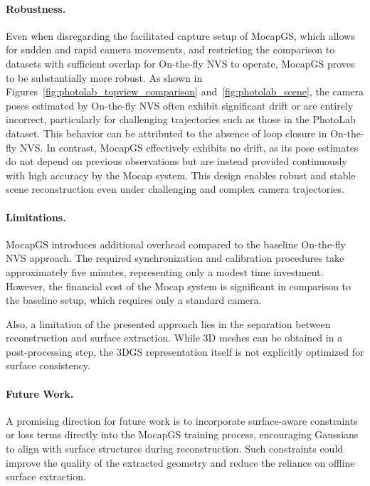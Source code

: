 \documentclass[a4paper,fleqn]{cas-dc}
\begin{document}
\paragraph{Robustness.}
Even when disregarding the facilitated capture setup of MocapGS, which allows for sudden and rapid camera movements, and restricting the comparison to datasets with sufficient overlap for On-the-fly NVS to operate, MocapGS proves to be substantially more robust. As shown in Figures~\ref{fig:photolab_topview_comparison} and~\ref{fig:photolab_scene}, the camera poses estimated by On-the-fly NVS often exhibit significant drift or are entirely incorrect, particularly for challenging trajectories such as those in the PhotoLab dataset. This behavior can be attributed to the absence of loop closure in On-the-fly NVS. In contrast, MocapGS effectively exhibits no drift, as its pose estimates do not depend on previous observations but are instead provided continuously with high accuracy by the Mocap system. This design enables robust and stable scene reconstruction even under challenging and complex camera trajectories.

\paragraph{Limitations.}
MocapGS introduces additional overhead compared to the baseline On-the-fly NVS approach. The required synchronization and calibration procedures take approximately five minutes, representing only a modest time investment. However, the financial cost of the Mocap system is significant in comparison to the baseline setup, which requires only a standard camera.

Also, a limitation of the presented approach lies in the separation between reconstruction and surface extraction. While 3D meshes can be obtained in a post-processing step, the 3DGS representation itself is not explicitly optimized for surface consistency.

\paragraph{Future Work.}
A promising direction for future work is to incorporate surface-aware constraints or loss terms directly into the MocapGS training process, encouraging Gaussians to align with surface structures during reconstruction. Such constraints could improve the quality of the extracted geometry and reduce the reliance on offline surface extraction.
\end{document}

